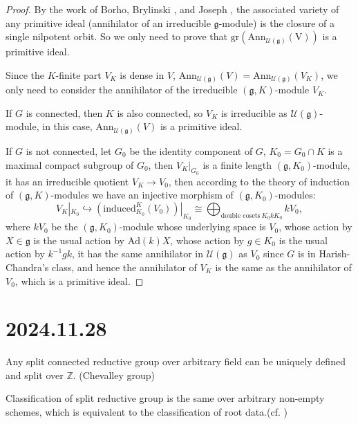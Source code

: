 \documentclass[12pt]{amsart}
\numberwithin{equation}{section}
\newcommand{\BZ}{{\mathbb {Z}}}
\newcommand{\CU}{{\mathcal {U}}}
\newcommand{\Ann}{{\mathrm{Ann}}}
\newcommand{\fg}{\mathfrak{g}}
\newcommand{\Ad}{{\mathrm{Ad}}}
\begin{document}
\begin{proof}
  By the work of Borho, Brylinski \cite{BB}, and Joseph \cite{Jos}, the associated variety of any primitive ideal (annihilator of an irreducible $\fg$-module) is the closure of a single nilpotent orbit. So we only need to prove that $\mathrm{gr}(\mathrm{Ann_{\CU(\fg)}(V)})$ is a primitive ideal.

  Since the $K$-finite part $V_K$ is dense in $V$, $\Ann_{\CU(\fg)}(V) = \Ann_{\CU(\fg)}(V_K)$, we only need to consider the annihilator of the irreducible $(\fg,K)$-module $V_K$.

  If $G$ is connected, then $K$ is also connected, so $V_K$ is irreducible as $\CU(\fg)$-module, in this case, $\Ann_{\CU(\fg)}(V)$ is a primitive ideal.

  If $G$ is not connected, let $G_0$ be the identity component of $G$, $K_0 = G_0 \cap K$ is a maximal compact subgroup of $G_0$, then $V_K|_{G_0}$ is a finite length $(\fg,K_0)$-module, it has an irreducible quotient $V_K \to V_0$, then according to the theory of induction of $(\fg,K)$-modules \cite[Chapter 2]{KV} we have an injective morphism of $(\fg,K_0)$-modules:
  \begin{equation}
     V_K|_{K_0} \hookrightarrow  (\mathrm{induced}_{K_0}^{K}(V_0))|_{K_0} \cong \bigoplus_{\textrm{double cosets} \ K_0 k K_0} kV_0,
  \end{equation}
  where $kV_0$ be the $(\fg,K_0)$-module whose underlying space is $V_0$, whose action by $X \in \fg$ is the usual action by $\Ad(k)X$, whose action by $g \in K_0$ is the usual action by $k^{-1}gk$, it has the same annihilator in $\CU(\fg)$ as $V_0$ since $G$ is in Harish-Chandra's class, and hence the annihilator of $V_K$ is the same as the annihilator of $V_0$, which is a primitive ideal.

\end{proof}

\newpage

\section{2024.11.28}
Any split connected reductive group over arbitrary field can be uniquely defined and split over $\BZ$. (Chevalley group)

Classification of split reductive group is the same over arbitrary non-empty schemes, which is equivalent to the classification of root data.(cf. \cite{SGA3})

\newpage
\end{document}
